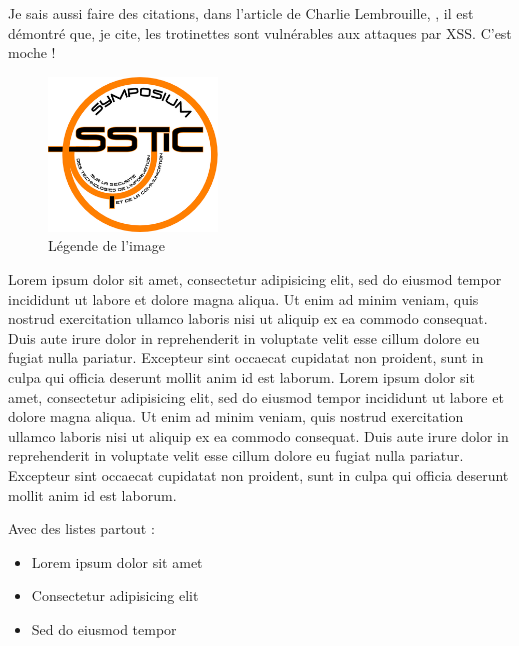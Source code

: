 Je sais aussi faire des citations, dans l'article de Charlie
Lembrouille, \cite{charlielembrouille}, il est démontré que, je cite,
\og{}les trotinettes sont vulnérables aux attaques par XSS\fg{}. C'est
moche !


\begin{figure}[ht]
  \centering
  \includegraphics[width=0.4\textwidth]{MonNom/img/archi}
  \caption{Légende de l'image}
  \label{fig:monnom:archi}
\end{figure}

Lorem ipsum dolor sit amet, consectetur adipisicing elit, sed do
eiusmod tempor incididunt ut labore et dolore magna aliqua. Ut enim ad
minim veniam, quis nostrud exercitation ullamco laboris nisi ut
aliquip ex ea commodo consequat. Duis aute irure dolor in
reprehenderit in voluptate velit esse cillum dolore eu fugiat nulla
pariatur. Excepteur sint occaecat cupidatat non proident, sunt in
culpa qui officia deserunt mollit anim id est laborum. Lorem ipsum
dolor sit amet, consectetur adipisicing elit, sed do eiusmod tempor
incididunt ut labore et dolore magna aliqua. Ut enim ad minim veniam,
quis nostrud exercitation ullamco laboris nisi ut aliquip ex ea
commodo consequat. Duis aute irure dolor in reprehenderit in voluptate
velit esse cillum dolore eu fugiat nulla pariatur. Excepteur sint
occaecat cupidatat non proident, sunt in culpa qui officia deserunt
mollit anim id est laborum.

Avec des listes partout :

\begin{itemize}
\item Lorem ipsum dolor sit amet
\item Consectetur adipisicing elit
\item Sed do eiusmod tempor
\end{itemize}


